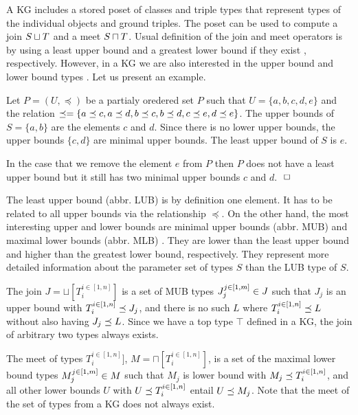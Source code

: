 \documentclass[runningheads]{llncs}
\newcommand{\finbox}{\phantom{.}\hfill\Box}
\begin{document}
A KG includes a stored poset of classes and triple types that
represent types of the individual objects and ground triples. The
poset can be used to compute a join $S\sqcup\/T$ and a meet
$S\sqcap\/T$. Usual definition of the join and meet operators is by
using a least upper bound and a greatest lower bound if they exist
\cite{Pierce2002}, respectively. However, in a KG we are also
interested in the upper bound and lower bound types
\cite{DaveyPriestley2002}. Let us present an example.

\begin{example}
  Let $P=(U,\preceq)$ be a partialy oredered set $P$ such that
  $U=\{a,b,c,d,e\}$ and the relation
  $\preceq=\{a\preceq\/c,a\preceq\/d,b\preceq\/c,b\preceq\/d,c\preceq\/e,d\preceq\/e\}$.
  The upper bounds of $S=\{a,b\}$ are the elements $c$ and $d$. Since
  there is no lower upper bounds, the upper bounds $\{c,d\}$ are
  minimal upper bounds. The least upper bound of $S$ is $e$.

  In the case that we remove the element $e$ from $P$ then $P$ does
  not have a least upper bound but it still has two minimal upper
  bounds $c$ and $d$. $\finbox$
\end{example}

The least upper bound (abbr. LUB) is by definition one element. It has
to be related to all upper bounds via the relationship $\preceq$.  On
the other hand, the most interesting upper and lower bounds are
minimal upper bounds (abbr. MUB) and maximal lower bounds (abbr. MLB)
\cite{Knudstorp2024}. They are lower than the least upper bound and
higher than the greatest lower bound, respectively. They represent
more detailed information about the parameter set of types $S$ than
the LUB type of $S$.

The join $J=\sqcup[T_i^{i\in[1,n]}]$ is a set of MUB types
$J_j^{j\in[1,m]}\in\/J$ such that $J_j$ is an upper bound with
$T_i^{i\in[1,n]}\preceq\/J_j$, and there is no such $L$ where
$T_i^{i\in[1,n]}\preceq\/L$ without also having $J_j\preceq\/L$. Since
we have a top type $\top$ defined in a KG, the join of arbitrary two
types always exists.

The meet of types $T_i^{i\in[1,n]}]$, $M=\sqcap[T_i^{i\in[1,n]}]$, is
a set of the maximal lower bound types $M_j^{j\in[1,m]}\in\/M$ such
that $M_j$ is lower bound with $M_j\preceq\/T_i^{i\in[1,n]}$, and all
other lower bounds $U$ with $U\preceq\/T_i^{i\in[1,n]}$ entail
$U\preceq\/M_j$. Note that the meet of the set of types from a KG does
not always exist.
\end{document}
